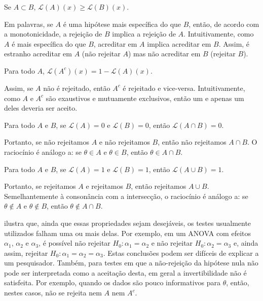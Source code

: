 \begin{definition}[Monotonicidade]
 Se $A \subset B$, 
 $\mathcal{L}(A)(x) \geq \mathcal{L}(B)(x)$.
\end{definition}
Em palavras, se $A$ é uma hipótese mais 
específica do que $B$, então, 
de acordo com a monotonicidade,
a rejeição de $B$ implica a rejeição de $A$.
Intuitivamente, como $A$ é mais específica do que $B$,
acreditar em $A$ implica acreditar em $B$.
Assim, é estranho acreditar em $A$ (não rejeitar $A$)
mas não acreditar em $B$ (rejeitar $B$).
 
\begin{definition}[Invertibilidade]
 Para todo $A$, 
 $\mathcal{L}(A^{c})(x) = 1-\mathcal{L}(A)(x)$.
\end{definition}
Assim, se $A$ não é rejeitado, então 
$A^{c}$ é rejeitado e vice-versa.
Intuitivamente, como $A$ e $A^{c}$ são exaustivos e
mutuamente exclusivos, então 
um e apenas um deles deveria ser aceito.
 
\begin{definition}
 Para todo $A$ e $B$, se 
 $\mathcal{L}(A) = 0$ e $\mathcal{L}(B) = 0$,
 então $\mathcal{L}(A \cap B) = 0$.
\end{definition}
Portanto, se não rejeitamos $A$ e 
não rejeitamos $B$, então 
não rejeitamos $A \cap B$.
O raciocínio é análogo a: 
se $\theta \in A$ e $\theta \in B$,
então $\theta \in A \cap B$.
 
\begin{definition}
 Para todo $A$ e $B$, se 
 $\mathcal{L}(A) = 1$ e 
 $\mathcal{L}(B) = 1$, então 
 $\mathcal{L}(A \cup B) = 1$.
\end{definition}
Portanto, se rejeitamos $A$ e 
rejeitamos $B$, então 
rejeitamos $A \cup B$.
Semelhantemente à consonância com a intersecção,
o raciocínio é análogo a:
se $\theta \notin A$ e 
$\theta \notin B$, então 
$\theta \notin A \cap B$.

\citet{Izbicki2015} ilustra que,
ainda que essas propriedades sejam desejáveis,
os testes usualmente utilizados falham 
uma ou mais delas.
Por exemplo, em um ANOVA com efeitos 
$\alpha_{1}$, $\alpha_{2}$ e $\alpha_{3}$,
é possível não rejeitar 
$H_{0}: \alpha_{1}=\alpha_{2}$ e não rejeitar
$H_{0}:\alpha_{2}=\alpha_{3}$ e, ainda assim,
rejeitar $H_{0}:\alpha_{1}=\alpha_{2}=\alpha_{3}$.
Estas conclusões podem ser difíceis de explicar a
um pesquisador. Também, para testes em que 
a não-rejeição da hipótese nula não 
pode ser interpretada como a aceitação desta,
em geral a invertibilidade não é satisfeita.
Por exemplo, quando os dados são 
pouco informativos para $\theta$, então, 
nestes casos, não se rejeita nem $A$ nem $A^{c}$. 

